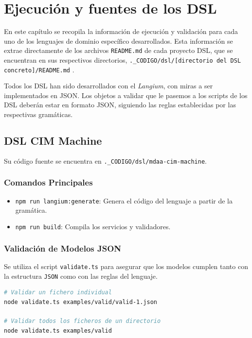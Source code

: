 \chapter{Ejecución y fuentes de los DSL}

En este capítulo se recopila la información de ejecución y validación para cada uno de los lenguajes de dominio específico desarrollados. Esta información se extrae directamente de los archivos \texttt{README.md} de cada proyecto DSL, que se encuentran en sus respectivos directorios, \texttt{.\_CODIGO/dsl/[directorio del DSL concreto]/README.md} .

Todos los DSL han sido desarrollados con el \textit{Langium}, con miras a ser implementados en JSON. Los objetos a validar que le pasemos a los scripts de los DSL deberán estar en formato JSON, siguiendo las reglas establecidas por las respectivas gramáticas.

\section{DSL CIM Machine}

Su código fuente se encuentra en \texttt{.\_CODIGO/dsl/mdaa-cim-machine}.

\subsection{Comandos Principales}
\begin{itemize}
    \item \texttt{npm run langium:generate}: Genera el código del lenguaje a partir de la gramática.
    \item \texttt{npm run build}: Compila los servicios y validadores.
\end{itemize}

\subsection{Validación de Modelos JSON}
Se utiliza el script \texttt{validate.ts} para asegurar que los modelos cumplen tanto con la estructura \texttt{JSON} como con las reglas del lenguaje.

\begin{lstlisting}[language=bash]
# Validar un fichero individual
node validate.ts examples/valid/valid-1.json

# Validar todos los ficheros de un directorio
node validate.ts examples/valid
\end{lstlisting}

